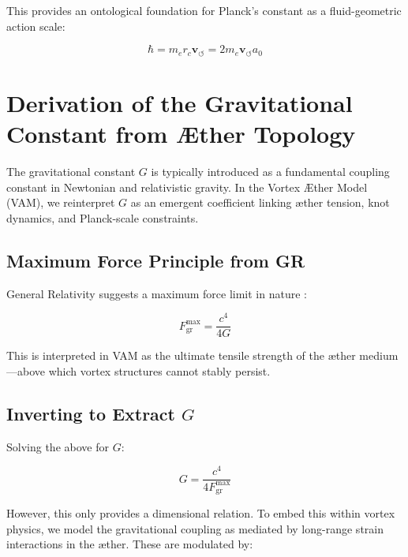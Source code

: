 \documentclass[12pt]{article}
\begin{document}
This provides an ontological foundation for Planck's constant as a fluid-geometric action scale:

\begin{equation}
    \boxed{\hbar = m_e r_c \mathbf{v}_{\scriptscriptstyle\boldsymbol{\circlearrowleft}} = 2 m_e \mathbf{v}_{\scriptscriptstyle\boldsymbol{\circlearrowleft}} a_0}
\end{equation}

\section{Derivation of the Gravitational Constant from Æther Topology}
\label{appendix:G}

The gravitational constant \( G \) is typically introduced as a fundamental coupling constant in Newtonian and relativistic gravity. In the Vortex Æther Model (VAM), we reinterpret \( G \) as an emergent coefficient linking æther tension, knot dynamics, and Planck-scale constraints.

\subsection*{Maximum Force Principle from GR}

General Relativity suggests a maximum force limit in nature \cite{scharf2016force, barcelo2011}:

\begin{equation}
    F^{\text{max}}_{\text{gr}} = \frac{c^4}{4G}
\end{equation}

This is interpreted in VAM as the ultimate tensile strength of the æther medium—above which vortex structures cannot stably persist.

\subsection*{Inverting to Extract \( G \)}

Solving the above for \( G \):

\begin{equation}
    G = \frac{c^4}{4 F^{\text{max}}_{\text{gr}}}
\end{equation}

However, this only provides a dimensional relation. To embed this within vortex physics, we model the gravitational coupling as mediated by long-range strain interactions in the æther. These are modulated by:
\end{document}
